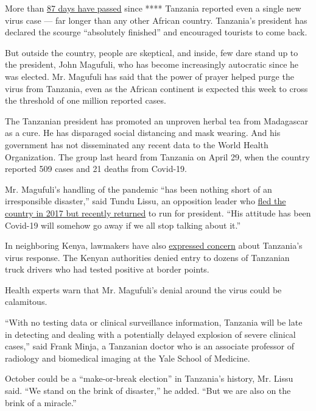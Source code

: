 More than
\href{https://www.who.int/docs/default-source/coronaviruse/situation-reports/20200803-covid-19-sitrep-196-cleared.pdf?sfvrsn=8a8a3ca4_6}{87
days have passed} since **** Tanzania reported even a single new virus
case --- far longer than any other African country. Tanzania's president
has declared the scourge ``absolutely finished'' and encouraged tourists
to come back.

But outside the country, people are skeptical, and inside, few dare
stand up to the president, John Magufuli, who has become increasingly
autocratic since he was elected. Mr. Magufuli has said that the power of
prayer helped purge the virus from Tanzania, even as the African
continent is expected this week to cross the threshold of one million
reported cases.

The Tanzanian president has promoted an unproven herbal tea from
Madagascar as a cure. He has disparaged social distancing and mask
wearing. And his government has not disseminated any recent data to the
World Health Organization. The group last heard from Tanzania on April
29, when the country reported 509 cases and 21 deaths from Covid-19.

Mr. Magufuli's handling of the pandemic ``has been nothing short of an
irresponsible disaster,'' said Tundu Lissu, an opposition leader who
\href{https://www.nytimes.com/aponline/2020/07/27/world/africa/ap-af-tanzania-opposition-leader-returns.html}{fled
the country in 2017 but recently returned} to run for president. ``His
attitude has been Covid-19 will somehow go away if we all stop talking
about it.''

In neighboring Kenya, lawmakers have also
\href{https://www.youtube.com/watch?v=K1PeaFeAxGM}{expressed concern}
about Tanzania's virus response. The Kenyan authorities denied entry to
dozens of Tanzanian truck drivers who had tested positive at border
points.

Health experts warn that Mr. Magufuli's denial around the virus could be
calamitous.

``With no testing data or clinical surveillance information, Tanzania
will be late in detecting and dealing with a potentially delayed
explosion of severe clinical cases,'' said Frank Minja, a Tanzanian
doctor who is an associate professor of radiology and biomedical imaging
at the Yale School of Medicine.

October could be a ``make-or-break election'' in Tanzania's history, Mr.
Lissu said. ``We stand on the brink of disaster,'' he added. ``But we
are also on the brink of a miracle.''

